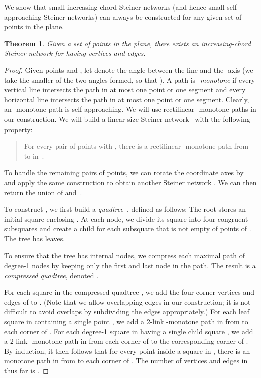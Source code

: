 \documentclass[11pt]{article}
\newtheorem{theorem}{Theorem}
\newcommand{\changeA}[1]{{#1}}
\begin{document}
We show that small increasing-chord Steiner networks (and hence small self-approaching Steiner networks) can always be constructed for any given set of points in the plane.

\begin{theorem}
\label{thm:steiner}
Given a set  of  points in the plane, there exists an increasing-chord Steiner network for  having  vertices and edges.
\end{theorem}
\begin{proof}
Given points  and , let  denote the angle between the
line  and the -axis (we take the smaller of the two angles
formed, so that ).
A path is {\em -monotone\/} if every vertical line intersects the path
\changeA{in at most one point or one segment and every horizontal line intersects the path in at most one point or one segment.}
Clearly, an -monotone path is self-approaching.
\changeA{We will use rectilinear -monotone paths in our construction.}
We will build a linear-size Steiner network~
with the following property:
\begin{quote}
For every pair of points  with
, there is
a \changeA{rectilinear} -monotone path from  to  in~.
\end{quote}
To handle the remaining pairs of points, we can rotate the coordinate axes by 
and apply the same construction to obtain another Steiner network .
We can then return the union of  and~.

To construct , we first build a {\em quadtree}~\cite{Har-Peled:book},
defined as follows:
The root stores an initial square enclosing .  At each node,
we divide its square into four congruent subsquares and create
a child for each subsquare that is not empty of points of .
The tree has  leaves.

To ensure that the tree has  internal nodes, we compress each maximal path
of degree-1 nodes by keeping only the first and last node in the path.
The result is a {\em compressed quadtree}, denoted .

For each square  in the compressed quadtree , we add the four corner vertices
and edges of  to .
(Note that we allow overlapping edges in our construction;
it is not difficult to avoid overlaps by subdividing the edges appropriately.)
For each leaf square  in  containing a single point ,
we add a 2-link -monotone path in  from  to each corner of .
For each degree-1 square  in  having a single child square ,
we add a 2-link -monotone path in 
from each corner of  to the corresponding corner of .
By induction, it then follows
that for every point  inside a square  in ,
there is an -monotone path in  from  to each corner of .
The number of vertices and edges in  thus far is .


\end{proof}
\end{document}
